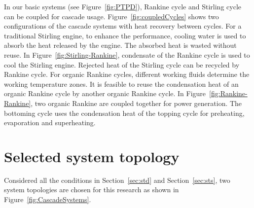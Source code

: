 In our basic systems (see Figure~\ref{fig:PTPD}), Rankine cycle and Stirling cycle can be coupled for cascade usage. 
Figure~\ref{fig:coupledCycles} shows two configurations of the cascade systems with heat recovery between cycles. 
For a traditional Stirling engine, to enhance the performance, cooling water is used to absorb the heat released by the engine. The absorbed heat is wasted without reuse.
In Figure~\ref{fig:Stirling-Rankine}, condensate of the Rankine cycle is used to cool the Stirling engine. Rejected heat of the Stirling cycle can be recycled by Rankine cycle. 
For organic Rankine cycles, different working fluids determine the working temperature zones. It is feasible to reuse the condensation heat of an organic Rankine cycle by another organic Rankine cycle.
In Figure~\ref{fig:Rankine-Rankine}, two organic Rankine are coupled together for power generation. The bottoming cycle uses the condensation heat of the topping cycle for preheating, evaporation and superheating.

\section{Selected system topology}
\label{sec:sst}
Considered all the conditions in Section~\ref{sec:std} and Section~\ref{sec:sts}, two system topologies are chosen for this research as shown in Figure~\ref{fig:CascadeSystems}. 

